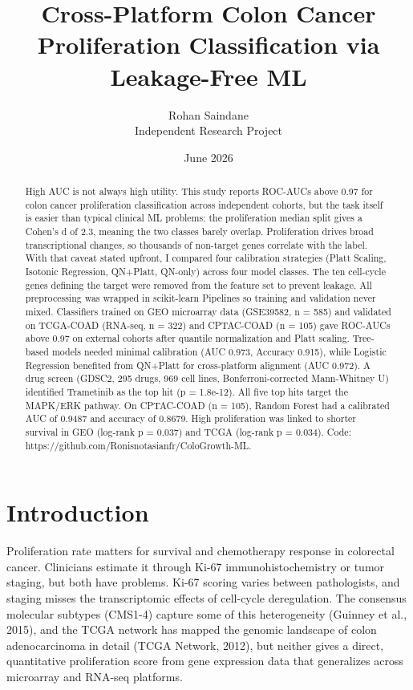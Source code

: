 \documentclass[11pt]{article}
\title{\textbf{Cross-Platform Colon Cancer Proliferation Classification via Leakage-Free ML}}
\author{Rohan Saindane\\Independent Research Project}
\date{June 2026}
\begin{document}
\maketitle

\begin{abstract}
High AUC is not always high utility. This study reports ROC-AUCs above 0.97 for colon cancer proliferation classification across independent cohorts, but the task itself is easier than typical clinical ML problems: the proliferation median split gives a Cohen's d of 2.3, meaning the two classes barely overlap. Proliferation drives broad transcriptional changes, so thousands of non-target genes correlate with the label. With that caveat stated upfront, I compared four calibration strategies (Platt Scaling, Isotonic Regression, QN+Platt, QN-only) across four model classes. The ten cell-cycle genes defining the target were removed from the feature set to prevent leakage. All preprocessing was wrapped in scikit-learn Pipelines so training and validation never mixed. Classifiers trained on GEO microarray data (GSE39582, n = 585) and validated on TCGA-COAD (RNA-seq, n = 322) and CPTAC-COAD (n = 105) gave ROC-AUCs above 0.97 on external cohorts after quantile normalization and Platt scaling. Tree-based models needed minimal calibration (AUC 0.973, Accuracy 0.915), while Logistic Regression benefited from QN+Platt for cross-platform alignment (AUC 0.972). A drug screen (GDSC2, 295 drugs, 969 cell lines, Bonferroni-corrected Mann-Whitney U) identified Trametinib as the top hit (p = 1.8e-12). All five top hits target the MAPK/ERK pathway. On CPTAC-COAD (n = 105), Random Forest had a calibrated AUC of 0.9487 and accuracy of 0.8679. High proliferation was linked to shorter survival in GEO (log-rank p = 0.037) and TCGA (log-rank p = 0.034). Code: https://github.com/Ronisnotasianfr/ColoGrowth-ML.
\end{abstract}

\section{Introduction}
Proliferation rate matters for survival and chemotherapy response in colorectal cancer. Clinicians estimate it through Ki-67 immunohistochemistry or tumor staging, but both have problems. Ki-67 scoring varies between pathologists, and staging misses the transcriptomic effects of cell-cycle deregulation. The consensus molecular subtypes (CMS1-4) capture some of this heterogeneity (Guinney et al., 2015), and the TCGA network has mapped the genomic landscape of colon adenocarcinoma in detail (TCGA Network, 2012), but neither gives a direct, quantitative proliferation score from gene expression data that generalizes across microarray and RNA-seq platforms.
\end{document}
